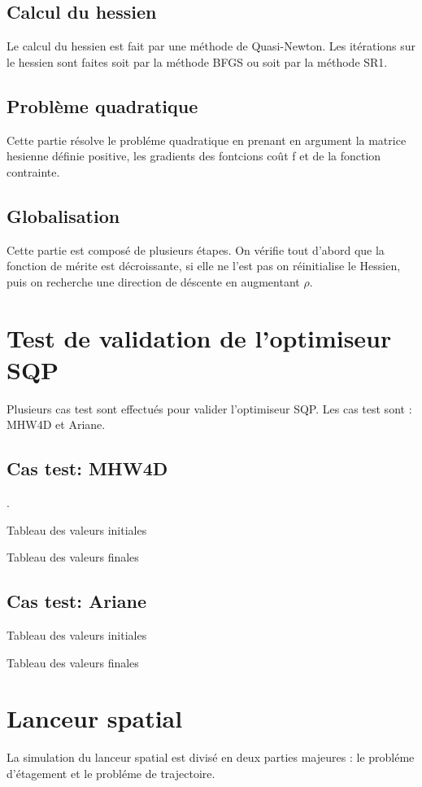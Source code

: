 \documentclass[a4paper,20pt]{article}
\begin{document}
\subsection{Calcul du hessien}
Le calcul du hessien est fait par une m\'ethode de Quasi-Newton. Les it\'erations
sur le hessien sont faites soit par la méthode BFGS ou soit par la méthode SR1.

\subsection{Probl\`eme quadratique}
Cette partie r\'esolve le probl\'eme quadratique en prenant en argument la matrice hesienne d\'efinie positive,
les gradients des fontcions co\^ut f et de la fonction contrainte.

\subsection{Globalisation}
Cette partie est compos\'e de plusieurs \'etapes. On v\'erifie tout d'abord que la fonction de m\'erite est d\'ecroissante,
si elle ne l'est pas on r\'einitialise le Hessien, puis on recherche une direction de d\'escente en augmentant $\rho$.

\section{Test de validation de l'optimiseur SQP}
Plusieurs cas test sont effectu\'es pour valider l'optimiseur SQP. Les cas test sont : MHW4D et Ariane.


\subsection {Cas test: MHW4D}.

Tableau des valeurs initiales

Tableau des valeurs finales

\subsection{Cas test: Ariane}

Tableau des valeurs initiales

Tableau des valeurs finales

\section{Lanceur spatial}
La simulation du lanceur spatial est divis\'e en deux parties majeures : le probl\'eme d'\'etagement et le probl\'eme de trajectoire.
\end{document}
